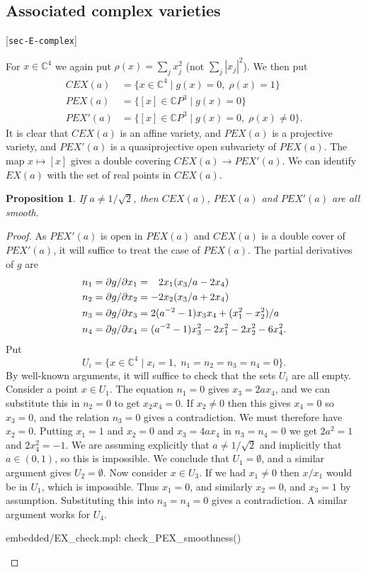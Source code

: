 \documentclass[reqno]{amsart}
\newcommand{\lbl}[1]{\label{#1}\textup{[\texttt{#1}]}\par}
\newcommand{\lbl}{\label}
\newcommand{\C}         {{\mathbb{C}}}
\newcommand{\st}        {\;|\;}
\newcommand{\rt}        {\sqrt{2}}
\newcommand{\pp}        {\hphantom{+}}
\renewcommand{\:}{\colon}
\newtheorem{proposition}[theorem]{Proposition}
\theoremstyle{definition}
\begin{document}
\subsection{Associated complex varieties}
\lbl{sec-E-complex}

For $x\in\C^4$ we again put $\rho(x)=\sum_jx_j^2$ (not
$\sum_j|x_j|^2$).  We then put
\begin{align*}
 CEX(a)  &= \{x\in\C^4 \st g(x)=0,\;\rho(x)=1\} \\
 PEX(a)  &= \{[x]\in\C P^3\st g(x)=0\} \\
 PEX'(a) &= \{[x]\in\C P^3\st g(x)=0,\;\rho(x)\neq 0\}.
\end{align*}
It is clear that $CEX(a)$ is an affine variety, and $PEX(a)$ is a
projective variety, and $PEX'(a)$ is a quasiprojective open subvariety
of $PEX(a)$.  The map $x\mapsto [x]$ gives a double covering
$CEX(a)\to PEX'(a)$.  We can identify $EX(a)$ with the set of real
points in $CEX(a)$.

\begin{proposition}
 If $a\neq 1/\rt$, then $CEX(a)$, $PEX(a)$ and $PEX'(a)$ are all
 smooth.
\end{proposition}
\begin{proof}
 As $PEX'(a)$ is open in $PEX(a)$ and $CEX(a)$ is a double cover of
 $PEX'(a)$, it will suffice to treat the case of $PEX(a)$.  The
 partial derivatives of $g$ are
 \begin{align*}
  n_1 = \partial g/\partial x_1 &= \pp 2x_1(x_3/a - 2x_4) \\
  n_2 = \partial g/\partial x_2 &=    -2x_2(x_3/a + 2x_4) \\
  n_3 = \partial g/\partial x_3 &= 2(a^{-2}-1)x_3x_4 + (x_1^2-x_2^2)/a \\
  n_4 = \partial g/\partial x_4 &= (a^{-2}-1)x_3^2 - 2x_1^2 - 2x_2^2 - 6x_4^2.
 \end{align*}
 Put
 \[ U_i = \{x\in\C^4\st x_i=1,\; n_1=n_2=n_3=n_4=0\}. \]
 By well-known arguments, it will suffice to check that the sets $U_i$
 are all empty.  Consider a point $x\in U_1$.  The equation $n_1=0$
 gives $x_3=2ax_4$, and we can substitute this in $n_2=0$ to get
 $x_2x_4=0$.  If $x_2\neq 0$ then this gives $x_4=0$ so $x_3=0$, and
 the relation $n_3=0$ gives a contradiction.  We must therefore have
 $x_2=0$.  Putting $x_1=1$ and $x_2=0$ and $x_3=4ax_4$ in $n_3=n_4=0$
 we get $2a^2=1$ and $2x_4^2=-1$.  We are assuming explicitly that
 $a\neq 1/\rt$ and implicitly that $a\in(0,1)$, so this is
 impossible.  We conclude that $U_1=\emptyset$, and a similar argument
 gives $U_2=\emptyset$.  Now consider $x\in U_3$.  If we had
 $x_1\neq 0$ then $x/x_1$ would be in $U_1$, which is impossible.
 Thus $x_1=0$, and similarly $x_2=0$, and $x_3=1$ by assumption.
 Substituting this into $n_3=n_4=0$ gives a contradiction.  A similar
 argument works for $U_4$.
 \begin{checks}
  embedded/EX_check.mpl: check_PEX_smoothness()
 \end{checks}
\end{proof}
\end{document}
